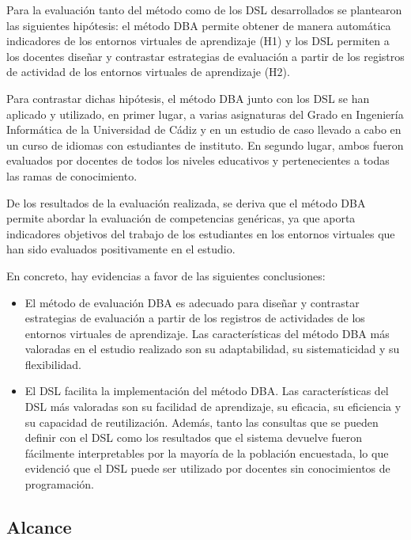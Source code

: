 Para la evaluación tanto del método como de los DSL desarrollados se plantearon las siguientes hipótesis: el método DBA permite obtener de manera automática indicadores de los entornos virtuales de aprendizaje (H1) y los DSL permiten a los docentes diseñar y contrastar estrategias de evaluación a partir de los registros de actividad de los entornos virtuales de aprendizaje (H2).

Para contrastar dichas hipótesis, el método DBA junto con los DSL se han aplicado y utilizado, en primer lugar, a varias asignaturas del Grado en Ingeniería Informática de la Universidad de Cádiz y en un estudio de caso llevado a cabo en un curso de idiomas con estudiantes de instituto. En segundo lugar, ambos fueron evaluados por docentes de todos los niveles educativos y pertenecientes a todas las ramas de conocimiento.

De los resultados de la evaluación realizada, se deriva que el método DBA permite abordar la evaluación de competencias genéricas, ya que aporta indicadores objetivos del trabajo de los estudiantes en los entornos virtuales que han sido evaluados positivamente en el estudio.

En concreto, hay evidencias a favor de las siguientes conclusiones:

\begin{itemize}
\item El método de evaluación DBA es adecuado para diseñar y contrastar estrategias de evaluación a partir de los registros de actividades de los entornos virtuales de aprendizaje. Las características del método DBA más valoradas en el estudio realizado son su adaptabilidad, su sistematicidad y su flexibilidad. 
\item El DSL facilita la implementación del método DBA. Las características del DSL más valoradas son su facilidad de aprendizaje, su eficacia, su eficiencia y su capacidad de reutilización. Además, tanto las consultas que se pueden definir con el DSL como los resultados que el sistema devuelve fueron fácilmente interpretables por la mayoría de la población encuestada, lo que evidenció que el DSL puede ser utilizado por docentes sin conocimientos de programación.
\end{itemize}

\subsection{Alcance}

